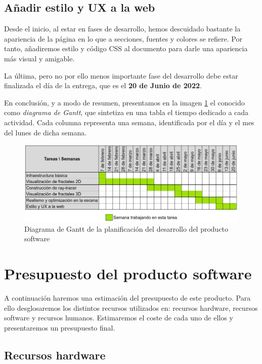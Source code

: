 \subsection*{Añadir estilo y UX a la web}

Desde el inicio, al estar en fases de desarrollo, hemos descuidado bastante la apariencia de la página en lo que a secciones, fuentes y colores se refiere. Por tanto, añadiremos estilo y código CSS al documento para darle una apariencia más visual y amigable.

La última, pero no por ello menos importante fase del desarrollo debe estar finalizada el día de la entrega, que es el \textbf{20 de Junio de 2022}.

\vspace{0.5cm}

En conclusión, y a modo de resumen, presentamos en la imagen \ref{fig:Gantt} el conocido como \textit{diagrama de Gantt}, que sintetiza en una tabla el tiempo dedicado a cada actividad. Cada columna representa una semana, identificada por el día y el mes del lunes de dicha semana.

\begin{figure} [ht]
    \centering
    \includegraphics[scale = 0.44]{img/Gantt.png}
    \caption{Diagrama de Gantt de la planificación del desarrollo del producto software}
    \label{fig:Gantt}
\end{figure}


\section*{Presupuesto del producto software}

A continuación haremos una estimación del presupuesto de este producto. Para ello desglosaremos los distintos recursos utilizados en: recursos hardware, recursos software y recursos humanos. Estimaremos el coste de cada uno de ellos y presentaremos un presupuesto final.

\subsection*{Recursos hardware}

